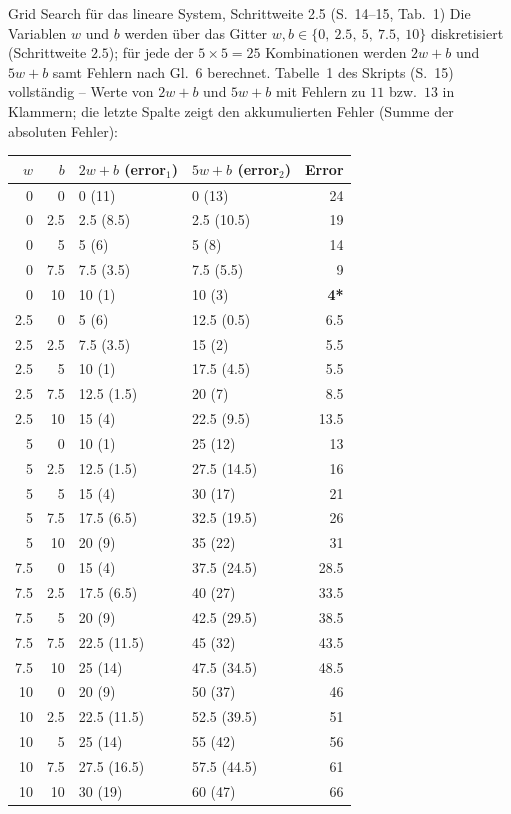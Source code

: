 \begin{bspbox}{Grid Search für das lineare System, Schrittweite 2.5 (S.~14--15, Tab.~1)}
Die Variablen $w$ und $b$ werden über das Gitter $w, b \in \{0,\ 2.5,\ 5,\ 7.5,\ 10\}$ diskretisiert (Schrittweite $2.5$); für jede der $5 \times 5 = 25$ Kombinationen werden $2w+b$ und $5w+b$ samt Fehlern nach Gl.~6 berechnet. Tabelle~1 des Skripts (S.~15) vollständig -- Werte von $2w+b$ und $5w+b$ mit Fehlern zu $11$ bzw.\ $13$ in Klammern; die letzte Spalte zeigt den akkumulierten Fehler (Summe der absoluten Fehler):

\begin{center}
\begin{tabular}{rrllr}
\toprule
$w$ & $b$ & $2w+b$ (error$_1$) & $5w+b$ (error$_2$) & Error \\
\midrule
0   & 0   & 0 (11)        & 0 (13)         & 24 \\
0   & 2.5 & 2.5 (8.5)     & 2.5 (10.5)     & 19 \\
0   & 5   & 5 (6)         & 5 (8)          & 14 \\
0   & 7.5 & 7.5 (3.5)     & 7.5 (5.5)      & 9 \\
0   & 10  & 10 (1)        & 10 (3)         & \textbf{4*} \\
2.5 & 0   & 5 (6)         & 12.5 (0.5)     & 6.5 \\
2.5 & 2.5 & 7.5 (3.5)     & 15 (2)         & 5.5 \\
2.5 & 5   & 10 (1)        & 17.5 (4.5)     & 5.5 \\
2.5 & 7.5 & 12.5 (1.5)    & 20 (7)         & 8.5 \\
2.5 & 10  & 15 (4)        & 22.5 (9.5)     & 13.5 \\
5   & 0   & 10 (1)        & 25 (12)        & 13 \\
5   & 2.5 & 12.5 (1.5)    & 27.5 (14.5)    & 16 \\
5   & 5   & 15 (4)        & 30 (17)        & 21 \\
5   & 7.5 & 17.5 (6.5)    & 32.5 (19.5)    & 26 \\
5   & 10  & 20 (9)        & 35 (22)        & 31 \\
7.5 & 0   & 15 (4)        & 37.5 (24.5)    & 28.5 \\
7.5 & 2.5 & 17.5 (6.5)    & 40 (27)        & 33.5 \\
7.5 & 5   & 20 (9)        & 42.5 (29.5)    & 38.5 \\
7.5 & 7.5 & 22.5 (11.5)   & 45 (32)        & 43.5 \\
7.5 & 10  & 25 (14)       & 47.5 (34.5)    & 48.5 \\
10  & 0   & 20 (9)        & 50 (37)        & 46 \\
10  & 2.5 & 22.5 (11.5)   & 52.5 (39.5)    & 51 \\
10  & 5   & 25 (14)       & 55 (42)        & 56 \\
10  & 7.5 & 27.5 (16.5)   & 57.5 (44.5)    & 61 \\
10  & 10  & 30 (19)       & 60 (47)        & 66 \\
\bottomrule
\end{tabular}
\end{center}


\end{bspbox}
